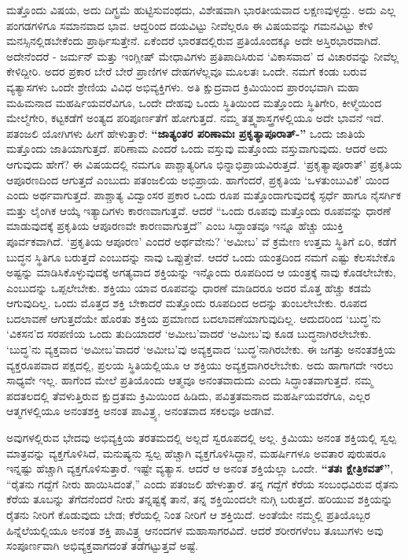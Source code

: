 ಮತ್ತೊಂದು ವಿಷಯ, ಅದು ದಿಗ್ಭ್ರಮೆ ಹುಟ್ಟಿಸುವಂಥದು, ವಿಶೇಷವಾಗಿ ಭಾರತೀಯವಾದ ಲಕ್ಷಣವುಳ್ಳದ್ದು. ಅದು ಎಲ್ಲ ಪಂಗಡಗಳಿಗೂ ಸಮಾನವಾದ ಭಾವ. ಆದ್ದರಿಂದ ದಯವಿಟ್ಟು ನೀವೆಲ್ಲರೂ ಈ ವಿಷಯವನ್ನು ಗಮನವಿಟ್ಟು ಕೇಳಿ ಮನಸ್ಸಿನಲ್ಲಿಡಬೇಕೆಂದು ಪ್ರಾರ್ಥಿಸುತ್ತೇನೆ. ಏಕೆಂದರೆ ಭಾರತದಲ್ಲಿರುವ ಪ್ರತಿಯೊಂದಕ್ಕೂ ಅದೇ ಅಸ್ತಿರಭಾರವಾಗಿದೆ. ಅದೇನೆಂದರೆ - ಜರ್ಮನ್​ ಮತ್ತು ಇಂಗ್ಲೀಷ್​ ಮೇಧಾವಿಗಳು ಪ್ರತಿಪಾದಿಸಿರುವ ‘ವಿಕಾಸವಾದ’ ದ ವಿಚಾರವನ್ನು ನೀವೆಲ್ಲ ಕೇಳಿದ್ದೀರಿ. ಅದರ ಪ್ರಕಾರ ಬೇರೆ ಬೇರೆ ಪ್ರಾಣಿಗಳ ದೇಹಗಳೆಲ್ಲವೂ ಮೂಲತಃ ಒಂದೇ. ನಮಗೆ ಕಂಡು ಬರುವ ವ್ಯತ್ಯಾಸಗಳು ಒಂದೇ ಶ್ರೇಣಿಯ ವಿವಿಧ ಅಭಿವ್ಯಕ್ತಿಗಳು. ಅತಿ ಕ್ಷುದ್ರವಾದ ಕ್ರಿಮಿಯಿಂದ ಪ್ರಾರಂಭವಾಗಿ ಮಹಾ ಮಹಿಮನಾದ ಮಹರ್ಷಿಯವರೆವಿಗೂ, ಒಂದೇ ದೇಹವು ಒಂದು ಸ್ಥಿತಿಯಿಂದ ಮತ್ತೊಂದು ಸ್ಥಿತಿಗೇರಿ, ಕೀಳ್ಮೆಯಿಂದ ಮೇಲ್ಮೆಗೇರಿ, ಕಟ್ಟಕಡೆಗೆ ಅಂತ್ಯದ ಪರಿಪೂರ್ಣತೆಗೆ ಹೋಗುತ್ತದೆ. ನಮ್ಮ ತತ್ತ್ವಶಾಸ್ತ್ರಗಳಲ್ಲಿಯೂ ಅದೇ ಭಾವನೆ ಇದೆ. ಪತಂಜಲಿ ಯೋಗಿಗಳು ಹೀಗೆ ಹೇಳುತ್ತಾರೆ: \textbf{“ಜಾತ್ಯಂತರ ಪರಿಣಾಮಃ ಪ್ರಕೃತ್ಯಾಪೂರಾತ್​-”} ಒಂದು ಜಾತಿಯೆ ಮತ್ತೊಂದು ಜಾತಿಯಾಗುತ್ತದೆ. ಪರಿಣಾಮ ಎಂದರೆ ಒಂದು ವಸ್ತುವು ಮತ್ತೊಂದು ವಸ್ತುವಾಗುವುದು. ಆದರೆ ಅದು ಆಗುವುದು ಹೇಗೆ? ಈ ವಿಷಯದಲ್ಲಿ ನಮಗೂ ಪಾಶ್ಚಾತ್ಯರಿಗೂ ಭಿನ್ನಾಭಿಪ್ರಾಯವಿರುತ್ತದೆ. ‘ಪ್ರಕೃತ್ಯಾಪೂರಾತ್​’ ಪ್ರಕೃತಿಯ ಆಪೂರಣದಿಂದ ಆಗುತ್ತದೆ ಎಂಬುದು ಪತಂಜಲಿಯ ಅಭಿಪ್ರಾಯ. ಹಾಗೆಂದರೆ, ಪ್ರಕೃತಿಯ ‘ಒಳತುಂಬುವಿಕೆ’ ಯಿಂದ ಎಂದು ಅರ್ಥವಾಗುತ್ತದೆ. ಪಾಶ್ಚಾತ್ಯ ವಿದ್ವಾಂಸರ ಪ್ರಕಾರ ಒಂದು ರೂಪ ಮತ್ತೊಂದಾಗುವುದಕ್ಕೆ ಸ್ಫರ್ಧೆ ಹಾಗೂ ನೈಸರ್ಗಿಕ ಮತ್ತು ಲೈಂಗಿಕ ಆಯ್ಕೆ ಇತ್ಯಾದಿಗಳು  ಕಾರಣವಾಗುತ್ತವೆ. ಆದರೆ “ಒಂದು ರೂಪವು ಮತ್ತೊಂದು ರೂಪವನ್ನು ಧಾರಣೆ ಮಾಡುವುದಕ್ಕೆ ಪ್ರಕೃತಿಯ ಆಪೂರಣವೇ ಕಾರಣವಾಗುತ್ತದೆ” ಎಂಬ ಸಿದ್ಧಾಂತವೂ ಇನ್ನೂ ಹೆಚ್ಚು ಯುಕ್ತಿ ಪೂರ್ವಕವಾಗಿದೆ. ‘ಪ್ರಕೃತಿಯ ಆಪೂರಣ’ ಎಂದರೆ ಅರ್ಥವೇನು? ‘ಅಮೀಬ’ ವೆ  ಕ್ರಮೇಣ ಉತ್ತಮ ಸ್ಥಿತಿಗೆ ಏರಿ, ಕಡೆಗೆ ಬುದ್ಧನ ಸ್ಥಿತಿಗೂ ಬರುತ್ತದೆ ಎಂಬುದನ್ನು ನಾವು ಒಪ್ಪುತ್ತೇವೆ. ಆದರೆ ಒಂದು ಯಂತ್ರದಿಂದ ನಮಗೆ ಎಷ್ಟು ಕೆಲಸಬೇಕೊ ಅಷ್ಟನ್ನು ಮಾಡಿಸಿಕೊಳ್ಳುವುದಕ್ಕೆ ಅಗತ್ಯವಾದ ಶಕ್ತಿಯನ್ನು ಇನ್ನೊಂದು ರೂಪದಿಂದ ಆ ಯಂತ್ರಕ್ಕೆ ನಾವು ಕೊಡಲೇಬೇಕು, ಎಂಬುದನ್ನು ಒಪ್ಪಲೇಬೇಕು. ಶಕ್ತಿಯು ಯಾವ ರೂಪವನ್ನು ಧಾರಣೆ ಮಾಡಿದರೂ ಅದರ ಮೊತ್ತ ಹೆಚ್ಚು ಕಡಮೆ ಆಗುವುದಿಲ್ಲ. ಒಂದು ಮೊತ್ತದ ಶಕ್ತಿ ಬೇಕಾದರೆ ಮತ್ತೊಂದು ರೂಪದಿಂದ ಅದನ್ನು ತುಂಬಲೇಬೇಕು. ರೂಪದ ಬದಲಾವಣೆ ಆಗುತ್ತದೆಯೇ ಹೊರತು ಶಕ್ತಿಯ ಪ್ರಮಾಣದ ಬದಲಾವಣೆಯಾಗುವುದಿಲ್ಲ. ಆದುದರಿಂದ ‘ಬುದ್ಧ’ನು ‘ವಿಕಸನ’ದ ಸರಪಣಿಯ ಒಂದು ತುದಿಯಾದರೆ ‘ಅಮೀಬ’ವಾದರೆ ‘ಅಮೀಬ’ವು ಕೂಡ ಬುದ್ಧನಾಗಿರಲೇಬೇಕು. ‘ಬುದ್ಧ’ನು ವ್ಯಕ್ತವಾದ ‘ಅಮೀಬ’ವಾದರೆ ‘ಅಮೀಬ’ವು ಅವ್ಯಕ್ತವಾದ ‘ಬುದ್ಧ’ನಾಗಿರಬೇಕು. ಈ ಜಗತ್ತು ಅನಂತಶಕ್ತಿಯ ವ್ಯಕ್ತರೂಪವಾದ ಪಕ್ಷದಲ್ಲಿ, ಪ್ರಲಯ ಸ್ಥಿತಿಯಲ್ಲಿಯೂ ಆ ಶಕ್ತಿಯು ಅವ್ಯಕ್ತವಾಗಿರಲೇಬೇಕು. ಅದು ಹಾಗಾಗದೇ ಇರಲು ಸಾಧ್ಯವೇ ಇಲ್ಲ. ಹಾಗೆಂದ ಮೇಲೆ ಪ್ರತಿಯೊಂದು ಆತ್ಮವೂ ಅನಂತವಾದುದು ಎಂದು ಸಿದ್ಧಾಂತವಾಗುತ್ತದೆ. ನಮ್ಮ ಪದತಲದಲ್ಲಿ ತೆವಳುತ್ತಿರುವ ಕ್ಷುದ್ರತಮ ಕ್ರಿಮಿಯಿಂದ ಹಿಡಿದು, ಪವಿತ್ರತಮನಾದ ಮಹರ್ಷಿಯವರೆಗೂ, ಎಲ್ಲರ ಆತ್ಮಗಳಲ್ಲಿಯೂ ಅನಂತಶಕ್ತಿ ಅನಂತ ಪಾವಿತ್ರ್ಯ, ಅನಂತವಾದ ಸಕಲವೂ ಅಡಗಿವೆ.

ಅವುಗಳಲ್ಲಿರುವ ಭೇದವು ಅಭಿವ್ಯಕ್ತಿಯ ತರತಮದಲ್ಲಿ ಅಲ್ಲದೆ ಸ್ವರೂಪದಲ್ಲಿ ಅಲ್ಲ. ಕ್ರಿಮಿಯು ಅನಂತ ಶಕ್ತಿಯಲ್ಲಿ ಸ್ವಲ್ಪ ಮಾತ್ರವನ್ನು ವ್ಯಕ್ತಗೊಳಿಸಿದೆ, ಮನುಷ್ಯನು ಸ್ವಲ್ಪ ಹೆಚ್ಚಾಗಿ ವ್ಯಕ್ತಗೊಳಿಸಿದ್ದಾನೆ, ಮಹರ್ಷಿಗಳೂ ಅವತಾರ ಪುರುಷರೂ ಇನ್ನಷ್ಟು ಹೆಚ್ಚಾಗಿ ವ್ಯಕ್ತಗೊಳಿಸುತ್ತಾರೆ. ಇಷ್ಟೇ ವ್ಯತ್ಯಾಸ. ಆದರೆ ಆ ಅನಂತ ಶಕ್ತಿಯೆಲ್ಲಾ ಒಂದೇ. \textbf{“ತತಃ ಕ್ಷೇತ್ರಿಕವತ್​”}, “ರೈತನು ಗದ್ದೆಗೆ ನೀರು ಹಾಯಿಸಿದಂತೆ,” ಎಂದು ಪತಂಜಲಿ ಹೇಳುತ್ತಾರೆ. ತನ್ನ ಗದ್ದೆಗೆ ಕೆರೆಯ ಸಂಬಂಧವಿರುವ ರೈತನು ಕೆರೆಯ ತೂಬನ್ನು ತೆಗೆದನೆಂದರೆ ನೀರು ತನ್ನಷ್ಟಕ್ಕೆ ತಾನೆ, ತನ್ನ ಶಕ್ತಿಯಿಂದಲೇ ನುಗ್ಗಿ ಬರುತ್ತದೆ. ಹರಿಯುವ ಶಕ್ತಿಯನ್ನು ರೈತನು ನೀರಿಗೆ ಕೊಡುವುದು ಬೇಡ; ಕೆರೆಯಲ್ಲಿ ನಿಂತ ನೀರಿಗೆ ಆ ಶಕ್ತಿಯಿದೆ. ಅಂತೆಯೇ ನಮ್ಮಲ್ಲಿ ಪ್ರತಿಯೊಬ್ಬರ ಹಿನ್ನೆಲೆಯಲ್ಲಿಯೂ ಅನಂತ ಶಕ್ತಿ ಪಾವಿತ್ರ್ಯ ಆನಂದಗಳ ಮಹಾಸಾಗರವಿದೆ. ಆದರೆ ಶರೀರಗಳೆಂಬ ತೂಬುಗಳು ಅವು ಸಂಪೂರ್ಣವಾಗಿ ಅಭಿವ್ಯಕ್ತವಾಗದಂತೆ ತಡೆಗಟ್ಟುತ್ತವೆ ಅಷ್ಟೆ.

